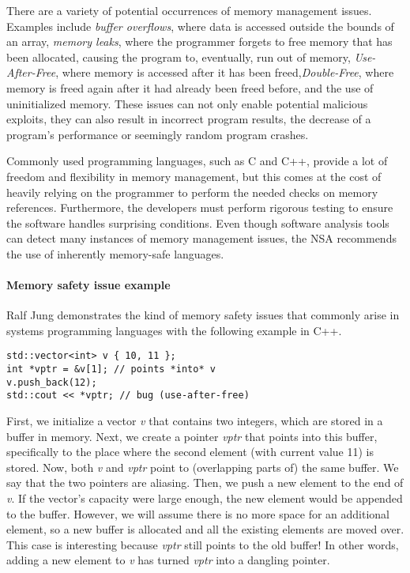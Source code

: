 \documentclass[sigplan,11pt,nonacm]{acmart}
\begin{document}
There are a variety of potential occurrences of memory management issues.
Examples include \emph{buffer overflows}, where data is accessed outside the bounds of an array, \emph{memory leaks}, where the programmer forgets to free memory that has been allocated, causing the program to, eventually, run out of memory, \emph{Use-After-Free}, where memory is accessed after it has been freed,\emph{Double-Free}, where memory is freed again after it had already been freed before, and the use of uninitialized memory.
These issues can not only enable potential malicious exploits, they can also result in incorrect program results, the decrease of a program's performance or seemingly random program crashes.

Commonly used programming languages, such as C and C++, provide a lot of freedom and flexibility in memory management, but this comes at the cost of heavily relying on the programmer to perform the needed checks on memory references.
Furthermore, the developers must perform rigorous testing to ensure the software handles surprising conditions.
Even though software analysis tools can detect many instances of memory management issues, the NSA recommends the use of inherently memory-safe languages.

\paragraph{Memory safety issue example}


Ralf Jung \cite{understanding-evolving-rust} demonstrates the kind of memory safety issues that commonly arise in systems programming languages with the following example in C++.

\begin{lstlisting}
std::vector<int> v { 10, 11 };
int *vptr = &v[1]; // points *into* v
v.push_back(12);
std::cout << *vptr; // bug (use-after-free)
\end{lstlisting}

First, we initialize a vector \emph{v} that contains two integers, which are stored in a buffer in memory.
Next, we create a pointer \emph{vptr} that points into this buffer, specifically to the place where the second element (with current value 11) is stored.
Now, both \emph{v} and \emph{vptr} point to (overlapping parts of) the same buffer.
We say that the two pointers are aliasing.
Then, we push a new element to the end of \emph{v}.
If the vector's capacity were large enough, the new element would be appended to the buffer.
However, we will assume there is no more space for an additional element, so a new buffer is allocated and all the existing elements are moved over.
This case is interesting because \emph{vptr} still points to the old buffer!
In other words, adding a new element to \emph{v} has turned \emph{vptr} into a dangling pointer.
\end{document}
